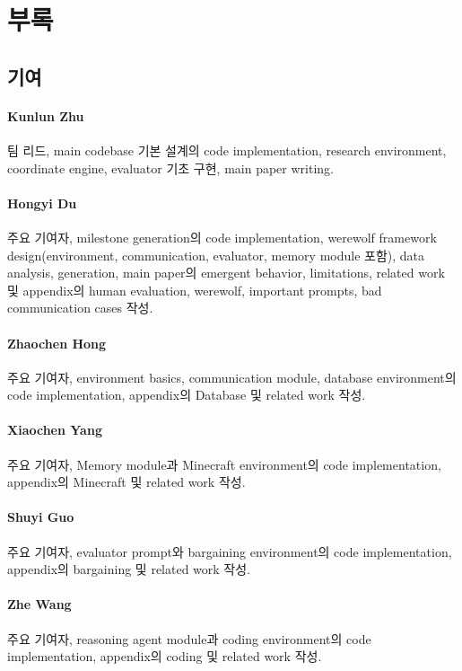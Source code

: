 
\appendix

\section{부록}

\subsection{기여}
\label{app_contrib}
\paragraph{Kunlun Zhu}
팀 리드, main codebase 기본 설계의 code implementation, research environment, coordinate engine, evaluator 기초 구현, main paper writing.

\paragraph{Hongyi Du}
주요 기여자, milestone generation의 code implementation, werewolf framework design(environment, communication, evaluator, memory module 포함), data analysis, generation, main paper의 emergent behavior, limitations, related work 및 appendix의 human evaluation, werewolf, important prompts, bad communication cases 작성.

\paragraph{Zhaochen Hong}
주요 기여자, environment basics, communication module, database environment의 code implementation, appendix의 Database 및 related work 작성.

\paragraph{Xiaochen Yang}
주요 기여자, Memory module과 Minecraft environment의 code implementation, appendix의 Minecraft 및 related work 작성.


\paragraph{Shuyi Guo}
주요 기여자, evaluator prompt와 bargaining environment의 code implementation, appendix의 bargaining 및 related work 작성.


\paragraph{Zhe Wang}
주요 기여자, reasoning agent module과 coding environment의 code implementation, appendix의 coding 및 related work 작성.


